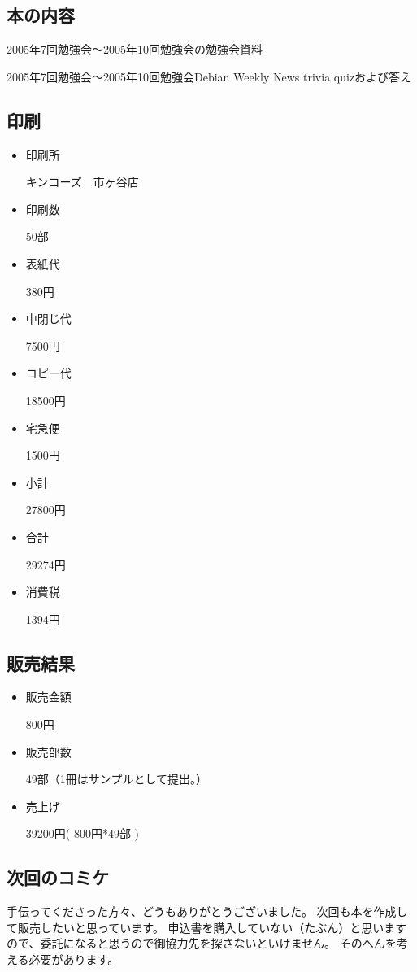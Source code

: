 \documentclass[mingoth,a4paper]{jsarticle}
\begin{document}
\subsection{本の内容}

	2005年7回勉強会〜2005年10回勉強会の勉強会資料

	2005年7回勉強会〜2005年10回勉強会Debian Weekly News trivia quizおよび答え
\subsection{印刷}
\begin{itemize}
 \item 印刷所

		キンコーズ　市ヶ谷店
 \item 印刷数

		50部
 \item 表紙代

		380円
 \item 中閉じ代

		7500円
 \item コピー代

		18500円
 \item 宅急便

		1500円
 \item 小計

		27800円
 \item 合計
	
		29274円
 \item 消費税 

		1394円
\end{itemize}

\subsection{販売結果}
\begin{itemize}
	\item 販売金額 

		800円

	\item 販売部数
 
		49部（1冊はサンプルとして提出。）

	\item 売上げ
 
		39200円( 800円*49部 )
\end{itemize}
\subsection{次回のコミケ}
手伝ってくださった方々、どうもありがとうございました。
次回も本を作成して販売したいと思っています。
申込書を購入していない（たぶん）と思いますので、委託になると思うので御協力先を探さないといけません。
そのへんを考える必要があります。
\end{document}
